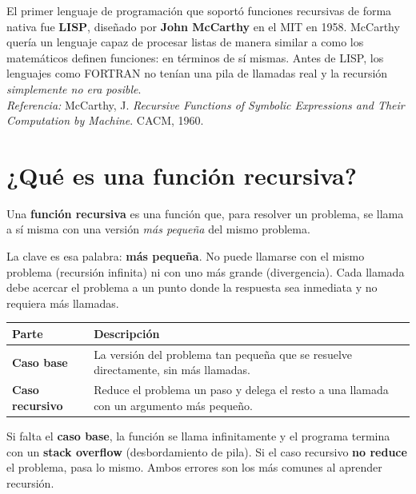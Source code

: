 \documentclass[12pt, oneside]{article}
\begin{document}
\begin{tecnico}
  El primer lenguaje de programación que soportó funciones recursivas
  de forma nativa fue \textbf{LISP}, diseñado por \textbf{John McCarthy}
  en el MIT en 1958.  McCarthy quería un lenguaje capaz de procesar listas
  de manera similar a como los matemáticos definen funciones: en términos
  de sí mismas.  Antes de LISP, los lenguajes como FORTRAN no tenían una
  pila de llamadas real y la recursión \textit{simplemente no era posible}.\\
  \textit{Referencia:} McCarthy, J. \textit{Recursive Functions of Symbolic
  Expressions and Their Computation by Machine}. CACM, 1960.
\end{tecnico}

\newpage

\section{¿Qué es una función recursiva?}

Una \textbf{función recursiva} es una función que, para resolver un problema,
se llama a sí misma con una versión \textit{más pequeña} del mismo problema.

La clave es esa palabra: \textbf{más pequeña}.  No puede llamarse con el mismo
problema (recursión infinita) ni con uno más grande (divergencia).
Cada llamada debe acercar el problema a un punto donde la respuesta sea
inmediata y no requiera más llamadas.

\begin{center}
\begin{tabular}{ll}
  \toprule
  \textbf{Parte} & \textbf{Descripción} \\
  \midrule
  \textbf{Caso base}      & La versión del problema tan pequeña que se resuelve
                            directamente, sin más llamadas. \\[4pt]
  \textbf{Caso recursivo} & Reduce el problema un paso y delega el resto a
                            una llamada con un argumento más pequeño. \\
  \bottomrule
\end{tabular}
\end{center}

\begin{advertencia}
  Si falta el \textbf{caso base}, la función se llama infinitamente y el
  programa termina con un \textbf{stack overflow} (desbordamiento de pila).
  Si el caso recursivo \textbf{no reduce} el problema, pasa lo mismo.
  Ambos errores son los más comunes al aprender recursión.
\end{advertencia}
\end{document}
